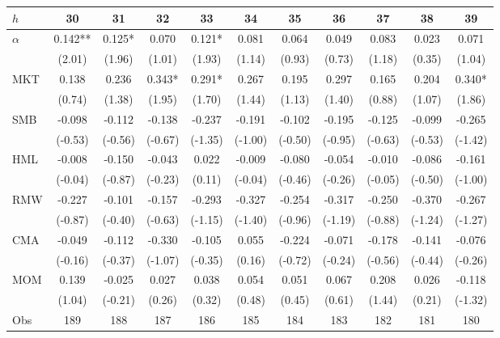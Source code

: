 \begin{tabular}{lcccccccccc}
\toprule
$h$ & 30 & 31 & 32 & 33 & 34 & 35 & 36 & 37 & 38 & 39 \\
\midrule
$\alpha$ & 0.142** & 0.125* & 0.070 & 0.121* & 0.081 & 0.064 & 0.049 & 0.083 & 0.023 & 0.071 \\
 & (2.01) & (1.96) & (1.01) & (1.93) & (1.14) & (0.93) & (0.73) & (1.18) & (0.35) & (1.04) \\
MKT & 0.138 & 0.236 & 0.343* & 0.291* & 0.267 & 0.195 & 0.297 & 0.165 & 0.204 & 0.340* \\
 & (0.74) & (1.38) & (1.95) & (1.70) & (1.44) & (1.13) & (1.40) & (0.88) & (1.07) & (1.86) \\
SMB & -0.098 & -0.112 & -0.138 & -0.237 & -0.191 & -0.102 & -0.195 & -0.125 & -0.099 & -0.265 \\
 & (-0.53) & (-0.56) & (-0.67) & (-1.35) & (-1.00) & (-0.50) & (-0.95) & (-0.63) & (-0.53) & (-1.42) \\
HML & -0.008 & -0.150 & -0.043 & 0.022 & -0.009 & -0.080 & -0.054 & -0.010 & -0.086 & -0.161 \\
 & (-0.04) & (-0.87) & (-0.23) & (0.11) & (-0.04) & (-0.46) & (-0.26) & (-0.05) & (-0.50) & (-1.00) \\
RMW & -0.227 & -0.101 & -0.157 & -0.293 & -0.327 & -0.254 & -0.317 & -0.250 & -0.370 & -0.267 \\
 & (-0.87) & (-0.40) & (-0.63) & (-1.15) & (-1.40) & (-0.96) & (-1.19) & (-0.88) & (-1.24) & (-1.27) \\
CMA & -0.049 & -0.112 & -0.330 & -0.105 & 0.055 & -0.224 & -0.071 & -0.178 & -0.141 & -0.076 \\
 & (-0.16) & (-0.37) & (-1.07) & (-0.35) & (0.16) & (-0.72) & (-0.24) & (-0.56) & (-0.44) & (-0.26) \\
MOM & 0.139 & -0.025 & 0.027 & 0.038 & 0.054 & 0.051 & 0.067 & 0.208 & 0.026 & -0.118 \\
 & (1.04) & (-0.21) & (0.26) & (0.32) & (0.48) & (0.45) & (0.61) & (1.44) & (0.21) & (-1.32) \\
Obs & 189 & 188 & 187 & 186 & 185 & 184 & 183 & 182 & 181 & 180 \\
\bottomrule
\end{tabular}